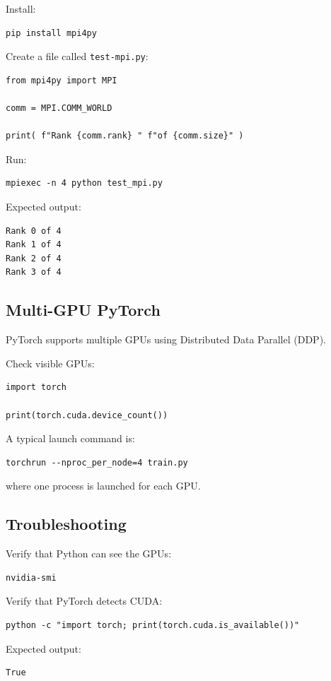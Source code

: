 Install: 

\begin{lstlisting} 
pip install mpi4py 
\end{lstlisting} 

Create a file called \texttt{test-mpi.py}: 

\begin{lstlisting} 
from mpi4py import MPI 

comm = MPI.COMM_WORLD 

print( f"Rank {comm.rank} " f"of {comm.size}" ) 
\end{lstlisting} 

Run: 

\begin{lstlisting} 
mpiexec -n 4 python test_mpi.py 
\end{lstlisting} 

Expected output: 

\begin{lstlisting} 
Rank 0 of 4 
Rank 1 of 4 
Rank 2 of 4 
Rank 3 of 4 
\end{lstlisting} 

\subsection{Multi-GPU PyTorch} 

PyTorch supports multiple GPUs using Distributed Data Parallel (DDP). 

Check visible GPUs: 

\begin{lstlisting} 
import torch 

print(torch.cuda.device_count()) 
\end{lstlisting} 

A typical launch command is: 

\begin{lstlisting} 
torchrun --nproc_per_node=4 train.py 
\end{lstlisting} 

where one process is launched for each GPU. 

\subsection{Troubleshooting} 

Verify that Python can see the GPUs: 

\begin{lstlisting} 
nvidia-smi 
\end{lstlisting} 

Verify that PyTorch detects CUDA: 

\begin{lstlisting} 
python -c "import torch; print(torch.cuda.is_available())" 
\end{lstlisting} 

Expected output: 

\begin{lstlisting} 
True 
\end{lstlisting}